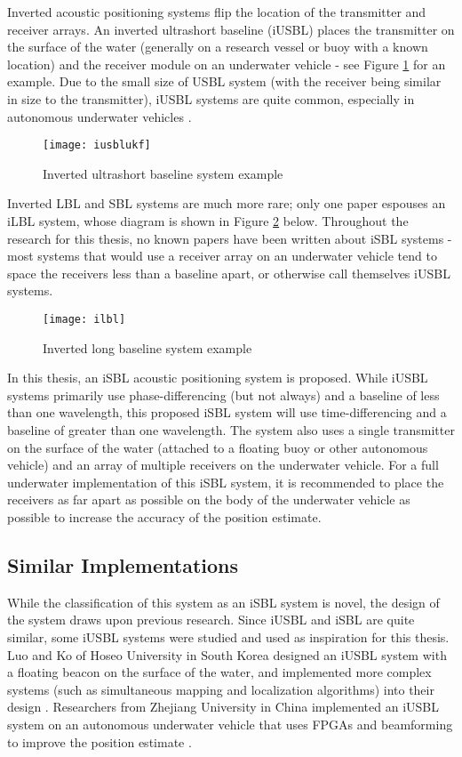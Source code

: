 \documentclass[12pt,a4paper]{report}
\begin{document}
Inverted acoustic positioning systems flip the location of the transmitter and receiver arrays. An inverted ultrashort baseline (iUSBL) places the transmitter on the surface of the water (generally on a research vessel or buoy with a known location) and the receiver module on an underwater vehicle - see Figure \ref{fig:iusblukf} for an example. Due to the small size of USBL system (with the receiver being similar in size to the transmitter), iUSBL systems are quite common, especially in autonomous underwater vehicles \cite{noveliusbl} \cite{passiveiusbl}.

\begin{figure}[htbp]
	\centering
	\texttt{[image: iusblukf]}
	\caption{Inverted ultrashort baseline system example \cite{iusblukf}}
	\label{fig:iusblukf}
\end{figure}

Inverted LBL and SBL systems are much more rare; only one paper espouses an iLBL system, whose diagram is shown in Figure \ref{fig:ilbl} below. Throughout the research for this thesis, no known papers have been written about iSBL systems - most systems that would use a receiver array on an underwater vehicle tend to space the receivers less than a baseline apart, or otherwise call themselves iUSBL systems.

\begin{figure}[htbp]
	\centering
	\texttt{[image: ilbl]}
	\caption{Inverted long baseline system example \cite{ilbl}}
	\label{fig:ilbl}
\end{figure}

In this thesis, an iSBL acoustic positioning system is proposed. While iUSBL systems primarily use phase-differencing (but not always) and a baseline of less than one wavelength, this proposed iSBL system will use time-differencing and a baseline of greater than one wavelength. The system also uses a single transmitter on the surface of the water (attached to a floating buoy or other autonomous vehicle) and an array of multiple receivers on the underwater vehicle. For a full underwater implementation of this iSBL system, it is recommended to place the receivers as far apart as possible on the body of the underwater vehicle as possible to increase the accuracy of the position estimate.

\subsection{Similar Implementations} \label{ssec:3s1s3}
While the classification of this system as an iSBL system is novel, the design of the system draws upon previous research. Since iUSBL and iSBL are quite similar, some iUSBL systems were studied and used as inspiration for this thesis. Luo and Ko of Hoseo University in South Korea designed an iUSBL system with a floating beacon on the surface of the water, and implemented more complex systems (such as simultaneous mapping and localization algorithms) into their design \cite{iusblukf}. Researchers from Zhejiang University in China implemented an iUSBL system on an autonomous underwater vehicle that uses FPGAs and beamforming to improve the position estimate \cite{passiveiusbl}.
\end{document}
